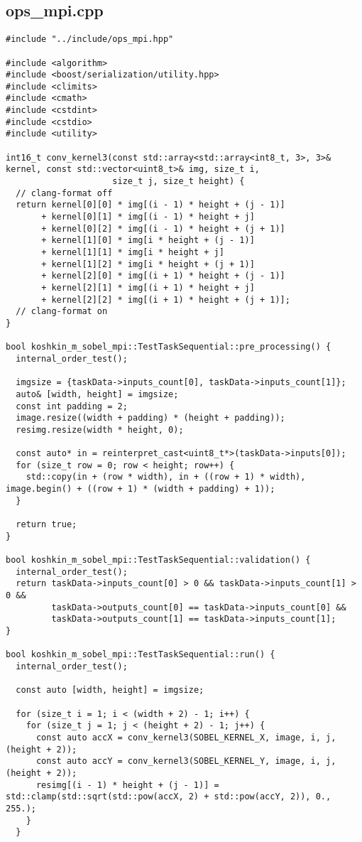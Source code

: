 \documentclass[12pt]{article}
\begin{document}
\subsection{ops\_mpi.cpp}
\begin{lstlisting}
#include "../include/ops_mpi.hpp"

#include <algorithm>
#include <boost/serialization/utility.hpp>
#include <climits>
#include <cmath>
#include <cstdint>
#include <cstdio>
#include <utility>

int16_t conv_kernel3(const std::array<std::array<int8_t, 3>, 3>& kernel, const std::vector<uint8_t>& img, size_t i,
                     size_t j, size_t height) {
  // clang-format off
  return kernel[0][0] * img[(i - 1) * height + (j - 1)]
       + kernel[0][1] * img[(i - 1) * height + j]
       + kernel[0][2] * img[(i - 1) * height + (j + 1)]
       + kernel[1][0] * img[i * height + (j - 1)]
       + kernel[1][1] * img[i * height + j]
       + kernel[1][2] * img[i * height + (j + 1)]
       + kernel[2][0] * img[(i + 1) * height + (j - 1)]
       + kernel[2][1] * img[(i + 1) * height + j]
       + kernel[2][2] * img[(i + 1) * height + (j + 1)];
  // clang-format on
}

bool koshkin_m_sobel_mpi::TestTaskSequential::pre_processing() {
  internal_order_test();

  imgsize = {taskData->inputs_count[0], taskData->inputs_count[1]};
  auto& [width, height] = imgsize;
  const int padding = 2;
  image.resize((width + padding) * (height + padding));
  resimg.resize(width * height, 0);

  const auto* in = reinterpret_cast<uint8_t*>(taskData->inputs[0]);
  for (size_t row = 0; row < height; row++) {
    std::copy(in + (row * width), in + ((row + 1) * width), image.begin() + ((row + 1) * (width + padding) + 1));
  }

  return true;
}

bool koshkin_m_sobel_mpi::TestTaskSequential::validation() {
  internal_order_test();
  return taskData->inputs_count[0] > 0 && taskData->inputs_count[1] > 0 &&
         taskData->outputs_count[0] == taskData->inputs_count[0] &&
         taskData->outputs_count[1] == taskData->inputs_count[1];
}

bool koshkin_m_sobel_mpi::TestTaskSequential::run() {
  internal_order_test();

  const auto [width, height] = imgsize;

  for (size_t i = 1; i < (width + 2) - 1; i++) {
    for (size_t j = 1; j < (height + 2) - 1; j++) {
      const auto accX = conv_kernel3(SOBEL_KERNEL_X, image, i, j, (height + 2));
      const auto accY = conv_kernel3(SOBEL_KERNEL_Y, image, i, j, (height + 2));
      resimg[(i - 1) * height + (j - 1)] = std::clamp(std::sqrt(std::pow(accX, 2) + std::pow(accY, 2)), 0., 255.);
    }
  }


\end{lstlisting}
\end{document}
